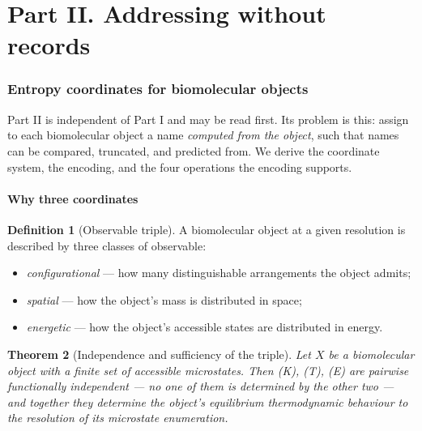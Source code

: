 \documentclass[11pt,twocolumn,a4paper]{article}
\theoremstyle{thmstyle}
\newtheorem{theorem}{Theorem}[section]
\theoremstyle{definition}
\newtheorem{definition}[theorem]{Definition}
\theoremstyle{remark}
\begin{document}
\part*{Part II. Addressing without records}

\section{Entropy coordinates for biomolecular objects}
\label{sec:sentropy}

Part II is independent of Part I and may be read first. Its problem is
this: assign to each biomolecular object a name \emph{computed from the
object}, such that names can be compared, truncated, and predicted
from. We derive the coordinate system, the encoding, and the four
operations the encoding supports.

\subsection{Why three coordinates}

\begin{definition}[Observable triple]
\label{def:observables}
A biomolecular object at a given resolution is described by three
classes of observable:
\begin{itemize}
\item[(K)] \emph{configurational} --- how many distinguishable
arrangements the object admits;
\item[(T)] \emph{spatial} --- how the object's mass is distributed in
space;
\item[(E)] \emph{energetic} --- how the object's accessible states are
distributed in energy.
\end{itemize}
\end{definition}

\begin{theorem}[Independence and sufficiency of the triple]
\label{thm:triple}
Let $X$ be a biomolecular object with a finite set of accessible
microstates. Then (K), (T), (E) are pairwise functionally independent
--- no one of them is determined by the other two --- and together they
determine the object's equilibrium thermodynamic behaviour to the
resolution of its microstate enumeration.
\end{theorem}
\end{document}
